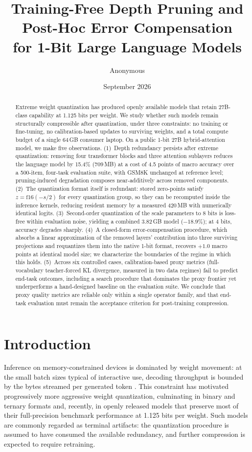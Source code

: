 \documentclass[10pt]{article}
\title{Training-Free Depth Pruning and Post-Hoc Error Compensation\\for 1-Bit Large Language Models}
\author{Anonymous}
\date{September 2026}
\begin{document}
\maketitle

\begin{abstract}
Extreme weight quantization has produced openly available models that retain 27B-class capability at 1.125 bits per weight. We study whether such models remain structurally compressible after quantization, under three constraints: no training or fine-tuning, no calibration-based updates to surviving weights, and a total compute budget of a single 64\,GB consumer laptop. On a public 1-bit 27B hybrid-attention model, we make five observations. (1)~Depth redundancy persists after extreme quantization: removing four transformer blocks and three attention sublayers reduces the language model by 15.4\% (709\,MB) at a cost of 4.5 points of macro accuracy over a 500-item, four-task evaluation suite, with GSM8K unchanged at reference level; pruning-induced degradation composes near-additively across removed components. (2)~The quantization format itself is redundant: stored zero-points satisfy $z=\mathrm{f16}(-s/2)$ for every quantization group, so they can be recomputed inside the inference kernels, reducing resident memory by a measured 420\,MB with numerically identical logits. (3)~Second-order quantization of the scale parameters to 8 bits is loss-free within evaluation noise, yielding a combined 3.82\,GB model ($-18.9$\%); at 4 bits, accuracy degrades sharply. (4)~A closed-form error-compensation procedure, which absorbs a linear approximation of the removed layers' contribution into three surviving projections and requantizes them into the native 1-bit format, recovers $+1.0$ macro points at identical model size; we characterize the boundaries of the regime in which this holds. (5)~Across six controlled cases, calibration-based proxy metrics (full-vocabulary teacher-forced KL divergence, measured in two data regimes) fail to predict end-task outcomes, including a search procedure that dominates the proxy frontier yet underperforms a hand-designed baseline on the evaluation suite. We conclude that proxy quality metrics are reliable only within a single operator family, and that end-task evaluation must remain the acceptance criterion for post-training compression.
\end{abstract}

\section{Introduction}
Inference on memory-constrained devices is dominated by weight movement: at the small batch sizes typical of interactive use, decoding throughput is bounded by the bytes streamed per generated token \citep{awq}. This constraint has motivated progressively more aggressive weight quantization, culminating in binary and ternary formats \citep{bitnet,bitnet158} and, recently, in openly released models that preserve most of their full-precision benchmark performance at 1.125 bits per weight. Such models are commonly regarded as terminal artifacts: the quantization procedure is assumed to have consumed the available redundancy, and further compression is expected to require retraining.
\end{document}
